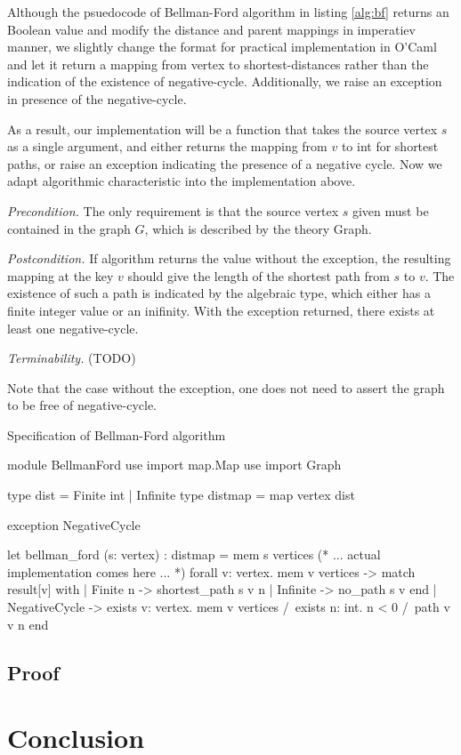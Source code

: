 \documentclass[a4paper,12pt]{article}
\begin{document}
Although the psuedocode of Bellman-Ford algorithm in listing
\ref{alg:bf} returns an Boolean value and modify the distance and
parent mappings in imperatiev manner, we slightly change the format
for practical implementation in O'Caml and let it return a mapping
from vertex to shortest-distances rather than the indication of the
existence of negative-cycle. Additionally, we raise an exception in
presence of the negative-cycle.

As a result, our implementation will be a function that takes the
source vertex $ s $ as a single argument, and either returns the
mapping from $ v $ to \mbox{\sc int} for shortest paths, or raise an
exception indicating the presence of a negative cycle. Now we adapt
algorithmic characteristic into the implementation above.

\emph{Precondition.} The only requirement is that the source vertex $
s $ given must be contained in the graph $ G $, which is described by
the theory \mbox{\sc Graph}.

\emph{Postcondition.} If algorithm returns the value without the
exception, the resulting mapping at the key $ v $ should give the
length of the shortest path from $ s $ to $ v $. The existence of such
a path is indicated by the algebraic type, which either has a finite
integer value or an inifinity. With the exception returned, there
exists at least one negative-cycle.

\emph{Terminability.} (TODO)

Note that the case without the exception, one does not need to assert
the graph to be free of negative-cycle.








\begin{algorithm}
\caption{Specification of Bellman-Ford algorithm}\label{lst:why_bf}
\begin{why3}[1]
module BellmanFord
  use import map.Map
  use import Graph

  type dist = Finite int | Infinite
  type distmap = map vertex dist

  exception NegativeCycle

  let bellman_ford (s: vertex) : distmap =
    { mem s vertices }
    (* ... actual implementation comes here ... *)
    { forall v: vertex. mem v vertices ->
        match result[v] with
        | Finite n -> shortest_path s v n
        | Infinite -> no_path s v
        end }
    | NegativeCycle ->
    { exists v: vertex. mem v vertices /\
      exists n: int. n < 0 /\ path v v n  }
end
\end{why3}
\end{algorithm}




\subsection{Proof}

\section{Conclusion}



\end{document}
